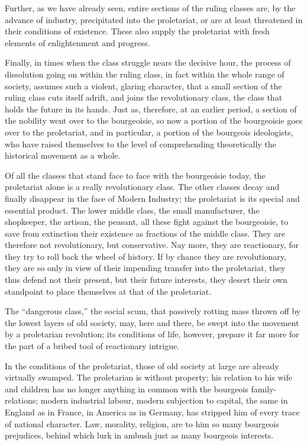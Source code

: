 Further, as we have already seen, entire sections of the ruling classes
are, by the advance of industry, precipitated into the proletariat, or
are at least threatened in their conditions of existence. These also
supply the proletariat with fresh elements of enlightenment and
progress.

Finally, in times when the class struggle nears the decisive hour, the
process of dissolution going on within the ruling class, in fact within
the whole range of society, assumes such a violent, glaring character,
that a small section of the ruling class cuts itself adrift, and joins
the revolutionary class, the class that holds the future in its hands.
Just as, therefore, at an earlier period, a section of the nobility
went over to the bourgeoisie, so now a portion of the bourgeoisie goes
over to the proletariat, and in particular, a portion of the bourgeois
ideologists, who have raised themselves to the level of comprehending
theoretically the historical movement as a whole.

Of all the classes that stand face to face with the bourgeoisie today,
the proletariat alone is a really revolutionary class. The other
classes decay and finally disappear in the face of Modern Industry; the
proletariat is its special and essential product. The lower middle
class, the small manufacturer, the shopkeeper, the artisan, the
peasant, all these fight against the bourgeoisie, to save from
extinction their existence as fractions of the middle class. They are
therefore not revolutionary, but conservative. Nay more, they are
reactionary, for they try to roll back the wheel of history. If by
chance they are revolutionary, they are so only in view of their
impending transfer into the proletariat, they thus defend not their
present, but their future interests, they desert their own standpoint
to place themselves at that of the proletariat.

The “dangerous class,” the social scum, that passively rotting mass
thrown off by the lowest layers of old society, may, here and there, be
swept into the movement by a proletarian revolution; its conditions of
life, however, prepare it far more for the part of a bribed tool of
reactionary intrigue.

In the conditions of the proletariat, those of old society at large are
already virtually swamped. The proletarian is without property; his
relation to his wife and children has no longer anything in common with
the bourgeois family-relations; modern industrial labour, modern
subjection to capital, the same in England as in France, in America as
in Germany, has stripped him of every trace of national character. Law,
morality, religion, are to him so many bourgeois prejudices, behind
which lurk in ambush just as many bourgeois interests.

